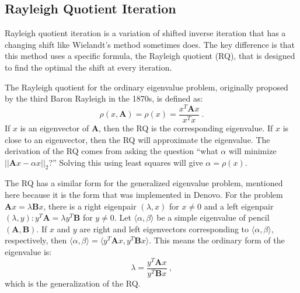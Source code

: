\documentclass[12pt]{article}
\newcommand{\ve}[1]{\ensuremath{\mathbf{#1}}}
\begin{document}
\subsection*{Rayleigh Quotient Iteration}
Rayleigh quotient iteration is a variation of shifted inverse iteration that has a changing shift like Wielandt's method sometimes does. The key difference is that this method uses a specific formula, the Rayleigh quotient (RQ), that is designed to find the optimal the shift at every iteration. 

The Rayleigh quotient for the ordinary eigenvalue problem, originally proposed by the third Baron Rayleigh in the 1870s, is defined as:%
%
\begin{equation}
  \rho(x, \ve{A}) = \rho(x) = \frac{x^{T}\ve{A}x}{x^{T}x} \:.
  \label{RQ}
\end{equation}
%
If $x$ is an eigenvector of $\ve{A}$, then the RQ is the corresponding eigenvalue. If $x$ is close to an eigenvector, then the RQ will approximate the eigenvalue. %
The derivation of the RQ comes from asking the question ``what $\alpha$ will minimize $||\ve{A}x - \alpha x||_2$?'' Solving this using least squares will give $\alpha = \rho(x)$.%

The RQ has a similar form for the generalized eigenvalue problem, mentioned here because it is the form that was implemented in Denovo. For the problem $\ve{A}x = \lambda \ve{B}x$, there is a right eigenpair $(\lambda, x)$ for $x \ne 0$ and a left eigenpair $(\lambda, y): y^{T}\ve{A} = \lambda y^{T}\ve{B}$ for $y \ne 0$. Let $\langle \alpha, \beta \rangle$ be a simple eigenvalue of pencil $(\ve{A}, \ve{B})$. If $x$ and $y$ are right and left eigenvectors corresponding to $\langle \alpha, \beta \rangle$, respectively, then $\langle \alpha, \beta \rangle = \langle y^{T} \ve{A} x, y^{T} \ve{B} x \rangle$. This means the ordinary form of the eigenvalue is:
\begin{equation}
 \lambda = \frac{y^{T} \ve{A} x}{y^{T} \ve{B} x} \:,
\end{equation}
which is the generalization of the RQ.%
\end{document}
